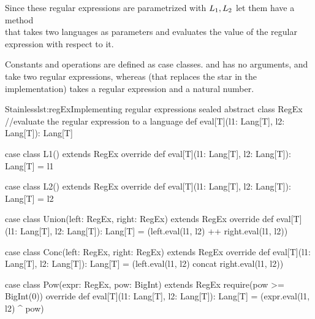 Since these regular expressions are parametrized with $L_{1}, L_{2}$ let them have a method \\  that takes two languages as parameters and evaluates the value of the regular expression with respect to it.


Constants and operations are defined as case classes.  and  has no arguments,  and  take two regular expressions, whereas  (that replaces the star in the implementation) takes a regular expression and a natural number.

\begin{Code}{Stainless}{lst:regEx}{Implementing regular expressions}
sealed abstract class RegEx {
//evaluate the regular expression to a language
def eval[T](l1: Lang[T], l2: Lang[T]): Lang[T]
}

case class L1() extends RegEx {
  override def eval[T](l1: Lang[T], l2: Lang[T]): Lang[T] = l1
}

case class L2() extends RegEx {
  override def eval[T](l1: Lang[T], l2: Lang[T]): Lang[T] = l2
}

case class Union(left: RegEx, right: RegEx) extends RegEx {
  override def eval[T](l1: Lang[T], l2: Lang[T]): Lang[T] = 
      (left.eval(l1, l2) ++ right.eval(l1, l2))
}

case class Conc(left: RegEx, right: RegEx) extends RegEx {
  override def eval[T](l1: Lang[T], l2: Lang[T]): Lang[T] = 
      (left.eval(l1, l2) concat right.eval(l1, l2))
}

case class Pow(expr: RegEx, pow: BigInt) extends RegEx {
  require(pow >= BigInt(0))
  override def eval[T](l1: Lang[T], l2: Lang[T]): Lang[T] = 
      (expr.eval(l1, l2) ^ pow)
}
\end{Code}

